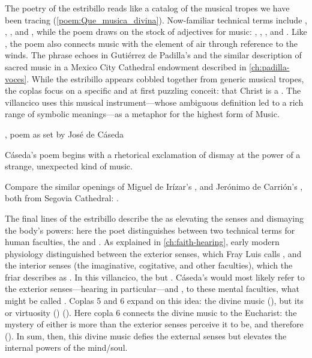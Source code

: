 The poetry of the estribillo reads like a catalog of the musical tropes we have
been tracing (\cref{poem:Que_musica_divina}).
Now-familiar technical terms include , ,
, and , while the poem draws on the stock
of adjectives for music: , ,
, and .
Like , the poem also connects music with the element of
air through reference to the winds.
The phrase  echoes  in Gutiérrez de Padilla's  and the
similar description of sacred music in a Mexico City Cathedral endowment
described in \cref{ch:padilla-voces}.
While the estribillo appears cobbled together from generic musical tropes, the
coplas focus on a specific and at first puzzling conceit: that Christ is a
.
The villancico uses this musical instrument---whose ambiguous definition led to
a rich range of symbolic meanings---as a metaphor for the highest form of
Music.

{, poem as set by José de Cáseda}


Cáseda's poem begins with a rhetorical exclamation of dismay at the power of a
strange, unexpected kind of music.%
\begin{Footnote}
    Compare the similar openings of Miguel de Irízar's , and Jerónimo de Carrión's ,
    both from Segovia Cathedral: \autocite[\XXX]{Cashner:PhD}.
\end{Footnote}
The final lines of the estribillo describe the  as
elevating the senses and dismaying the body's powers: here the poet
distinguishes between two technical terms for human faculties, the
 and .
As explained in \cref{ch:faith-hearing}, early modern physiology distinguished
between the exterior senses, which Fray Luis calls , and the interior senses (the imaginative, cogitative, and other
faculties), which the friar describes as .
In this villancico, the   but
.  
Cáseda's  would most likely refer to the exterior
senses---hearing in particular---and , to these mental
faculties, what might be called .
Coplas 5 and 6 expand on this idea: the divine music  (), but its  or virtuosity
() 
().
Here copla 6 connects the divine music to the Eucharist: the mystery of either
is more than the exterior senses perceive it to be, and therefore
().
In sum, then, this divine music defies the external senses but elevates the
internal powers of the mind/soul.

